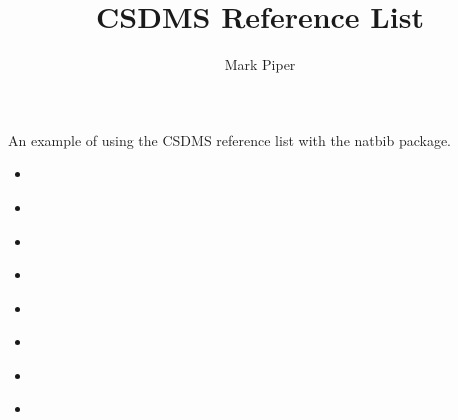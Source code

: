 \documentclass[11pt]{article}
\begin{document}
\title{CSDMS Reference List}
\author{Mark Piper}
\maketitle

An example of using the CSDMS reference list
with the natbib package.

\begin{itemize}
\item \citep{tucker2010modeling}
\item \citet{overeem2015strategies}
\item \citep{kettner2008hydrotrend}
\item \citet{hutton2008sedflux}
\item \cite{piper2015wmt}
\item \cite{blanca2017compute}
\item \cite{jupyter2015notebook}
\item \cite{gdal2017gdal}
\end{itemize}


\end{document}
